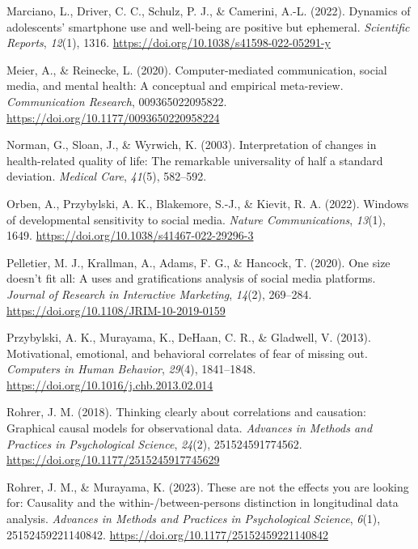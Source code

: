 \documentclass[
  man,mask,floatsintext]{apa7}
\newlength{\cslhangindent}
\newenvironment{CSLReferences}[2] %
 {\begin{list}{}{%
  \setlength{\itemindent}{0pt}
  \setlength{\leftmargin}{0pt}
  \setlength{\parsep}{0pt}
  \ifodd #1
   \setlength{\leftmargin}{\cslhangindent}
   \setlength{\itemindent}{-1\cslhangindent}
  \fi
  \setlength{\itemsep}{#2\baselineskip}}}
 {\end{list}}
\begin{document}
\begin{CSLReferences}{1}{0}
Marciano, L., Driver, C. C., Schulz, P. J., \& Camerini, A.-L. (2022). Dynamics of adolescents' smartphone use and well-being are positive but ephemeral. \emph{Scientific Reports}, \emph{12}(1), 1316. \url{https://doi.org/10.1038/s41598-022-05291-y}

Meier, A., \& Reinecke, L. (2020). Computer-mediated communication, social media, and mental health: {A} conceptual and empirical meta-review. \emph{Communication Research}, 009365022095822. \url{https://doi.org/10.1177/0093650220958224}

Norman, G., Sloan, J., \& Wyrwich, K. (2003). Interpretation of changes in health-related quality of life: {The} remarkable universality of half a standard deviation. \emph{Medical Care}, \emph{41}(5), 582--592.

Orben, A., Przybylski, A. K., Blakemore, S.-J., \& Kievit, R. A. (2022). Windows of developmental sensitivity to social media. \emph{Nature Communications}, \emph{13}(1), 1649. \url{https://doi.org/10.1038/s41467-022-29296-3}

Pelletier, M. J., Krallman, A., Adams, F. G., \& Hancock, T. (2020). One size doesn't fit all: A uses and gratifications analysis of social media platforms. \emph{Journal of Research in Interactive Marketing}, \emph{14}(2), 269--284. \url{https://doi.org/10.1108/JRIM-10-2019-0159}

Przybylski, A. K., Murayama, K., DeHaan, C. R., \& Gladwell, V. (2013). Motivational, emotional, and behavioral correlates of fear of missing out. \emph{Computers in Human Behavior}, \emph{29}(4), 1841--1848. \url{https://doi.org/10.1016/j.chb.2013.02.014}

Rohrer, J. M. (2018). Thinking clearly about correlations and causation: {Graphical} causal models for observational data. \emph{Advances in Methods and Practices in Psychological Science}, \emph{24}(2), 251524591774562. \url{https://doi.org/10.1177/2515245917745629}

Rohrer, J. M., \& Murayama, K. (2023). These are not the effects you are looking for: {Causality} and the within-/between-persons distinction in longitudinal data analysis. \emph{Advances in Methods and Practices in Psychological Science}, \emph{6}(1), 25152459221140842. \url{https://doi.org/10.1177/25152459221140842}


\end{CSLReferences}
\end{document}
